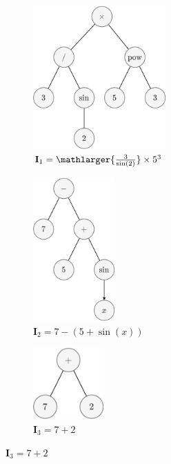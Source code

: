   \begin{figure}[ht!]
    \centering
    \begin{subfigure}[t]{0.4\textwidth}
      \centering
      \includegraphics[height=5.5cm]{img/theoretical_framework/GP Initial Population 1.png}
      \caption{\(\mathbf{I}_1 = \mathlarger{\frac{3}{\sin(2)}} \times 5^3\)}
      \label{fig:genetic_programming:initialization:population:1}
    \end{subfigure}
    \begin{subfigure}[t]{0.4\textwidth}
      \centering
      \includegraphics[height=5.5cm]{img/theoretical_framework/GP Initial Population 2.png}
      \caption{\(\mathbf{I}_2 = 7 - (5 + \sin(x))\)}
      \label{fig:genetic_programming:initialization:population:2}
    \end{subfigure}
    \begin{subfigure}[t]{0.4\textwidth}
      \centering
      \includegraphics[height=2.75cm]{img/theoretical_framework/GP Initial Population 3.png}
      \caption{\(\mathbf{I}_3 = 7 + 2\)}
      \label{fig:genetic_programming:initialization:population:3}
    \end{subfigure}

\end{figure}
